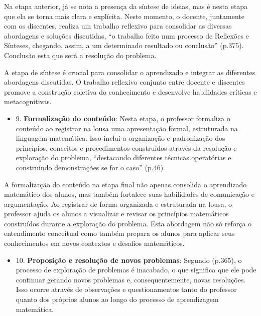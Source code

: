 Na etapa anterior, já se nota a presença da síntese de ideias, mas é nesta etapa que ela se torna mais clara e explícita. Neste momento, o docente, juntamente com os discentes, realiza um trabalho reflexivo para consolidar as diversas abordagens e soluções discutidas, ``o trabalho feito num processo de Reflexões e Sínteses, chegando, assim, a um determinado resultado ou conclusão'' \cite{ANDRADE2017} (p.375). Conclusão esta que será a resolução do problema.

A etapa de síntese é crucial para consolidar o aprendizado e integrar as diferentes abordagens discutidas. O trabalho reflexivo conjunto entre docente e discentes promove a construção coletiva do conhecimento e desenvolve habilidades críticas e metacognitivas.


\begin{itemize}
    \item 9. \textbf{Formalização do conteúdo}: Nesta etapa, o professor formaliza o conteúdo ao registrar na lousa uma apresentação formal, estruturada na linguagem matemática. Isso inclui a organização e padronização dos princípios, conceitos e procedimentos construídos através da resolução e exploração do problema, ``destacando diferentes técnicas operatórias e construindo demonstrações se for o caso'' \cite{resolucaoDeProblemas2019} (p.46).
\end{itemize}

A formalização do conteúdo na etapa final não apenas consolida o aprendizado matemático dos alunos, mas também fortalece suas habilidades de comunicação e argumentação. Ao registrar de forma organizada e estruturada na lousa, o professor ajuda os alunos a visualizar e revisar os princípios matemáticos construídos durante a exploração do problema. Esta abordagem não só reforça o entendimento conceitual como também prepara os alunos para aplicar seus conhecimentos em novos contextos e desafios matemáticos.


\begin{itemize}
    \item 10. \textbf{Proposição e resolução de novos problemas}: Segundo  (p.365), o processo de exploração de problemas é inacabado, o que significa que ele pode continuar gerando novos problemas e, consequentemente, novas resoluções. Isso ocorre através de observações e questionamentos tanto do professor quanto dos próprios alunos ao longo do processo de aprendizagem matemática.
\end{itemize}

